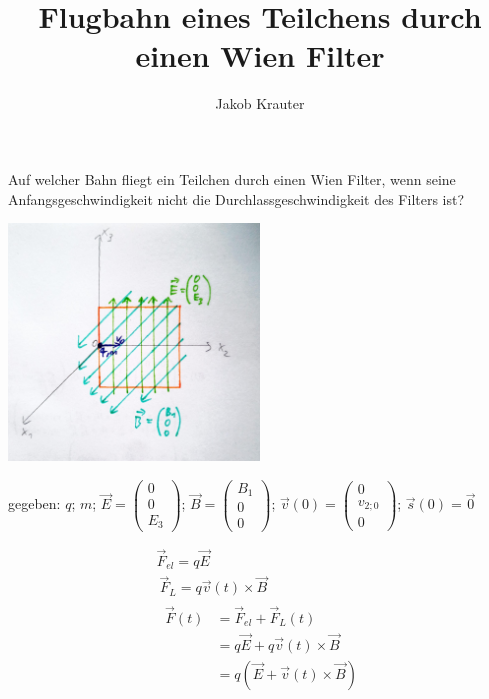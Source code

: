 \documentclass[german, a4paper, 10pt]{article}
\title{Flugbahn eines Teilchens durch einen Wien Filter}
\author{Jakob Krauter}
\date{\monthname \space \the\year}
\begin{document}
\maketitle

Auf welcher Bahn fliegt ein Teilchen durch einen Wien Filter, wenn seine Anfangsgeschwindigkeit nicht die Durchlassgeschwindigkeit des Filters ist?

\vspace{2pt}

\centering
\includegraphics[width=0.5\textwidth]{sketch}

\vspace{2pt}

gegeben: $q$; $m$; $\vec{E}=\begin{pmatrix} 0 \\ 0 \\ E_3 \end{pmatrix}$; $\vec{B}=\begin{pmatrix} B_1 \\ 0 \\ 0 \end{pmatrix}$; $\vec{v}(0)=\begin{pmatrix} 0 \\ v_{2;0} \\ 0 \end{pmatrix}$; $\vec{s}(0) = \vec{0}$

\vspace{2pt}

\begin{gather}
\vec{F}_{el} = q \vec{E} \\\
%
\vec{F}_L = q \vec{v}(t) \times \vec{B} \\\
%
\begin{split}
\vec{F}(t) &= \vec{F}_{el} + \vec{F}_L(t)		\\\
           &= q \vec{E} + q \vec{v}(t) \times \vec{B}   \\\
           &= q (\vec{E} + \vec{v}(t) \times \vec{B})
\end{split}
\end{gather}
\end{document}
